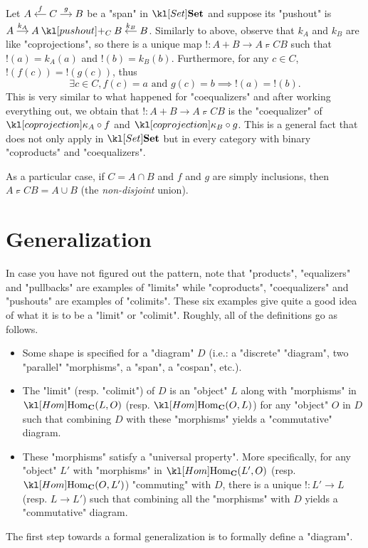 \documentclass[main.tex]{subfiles}
\begin{document}
\begin{exmp}[$\catSet$]
    Let $\begin{tikzcd}[cramped, sep=small]A & C \arrow[l, "f"'] \arrow[r, "g"]& B \end{tikzcd}$ be a "span" in $\catSet$ and suppose its "pushout" is $\begin{tikzcd}[cramped, sep=small] A \arrow[r, "k_A"] & A\pushout{C} B & B \arrow[l, "k_B"'] \end{tikzcd}$. Similarly to above, observe that $k_A$ and $k_B$ are like "coprojections", so there is a unique map $!: A+ B \rightarrow A\pushout{C} B$ such that $!(a) = k_A(a)$ and $!(b) = k_B(b)$. Furthermore, for any $c \in C$, $!(f(c)) = !(g(c))$, thus 
    \[\exists c \in C, f(c)=a \text{ and } g(c) = b \implies !(a) = !(b).\]
    This is very similar to what happened for "coequalizers" and after working everything out, we obtain that $!:A+B \rightarrow A \pushout{C} B$ is the "coequalizer" of $\coprojection_A \circ f$ and $\coprojection_B \circ g$. This is a general fact that does not only apply in $\catSet$ but in every category with binary "coproducts" and "coequalizers".

    As a particular case, if $C = A\cap B$ and $f$ and $g$ are simply inclusions, then $A \pushout{C} B = A\cup B$ (the \textit{non-disjoint} union).
\end{exmp}
\section{Generalization}%
In case you have not figured out the pattern, note that "products", "equalizers" and "pullbacks" are examples of "limits" while "coproducts", "coequalizers" and "pushouts" are examples of "colimits". These six examples give quite a good idea of what it is to be a "limit" or "colimit". Roughly, all of the definitions go as follows.
\begin{itemize}
    \item Some shape is specified for a "diagram" $D$ (i.e.: a "discrete" "diagram", two "parallel" "morphisms", a "span", a "cospan", etc.).
    \item The "limit" (resp. "colimit") of $D$ is an "object" $L$ along with "morphisms" in $\Hom_{\mathbf{C}}(L,O)$ (resp. $\Hom_{\mathbf{C}}(O,L)$) for any "object" $O$ in $D$ such that combining $D$ with these "morphisms" yields a "commutative" diagram.
    \item These "morphisms" satisfy a "universal property". More specifically, for any "object" $L'$ with "morphisms" in $\Hom_{\mathbf{C}}(L',O)$ (resp. $\Hom_{\mathbf{C}}(O,L')$) "commuting" with $D$, there is a unique $!:L'\rightarrow L$ (resp. $L \rightarrow L'$) such that combining all the "morphisms" with $D$ yields a "commutative" diagram.
\end{itemize}
The first step towards a formal generalization is to formally define a "diagram".
\end{document}

